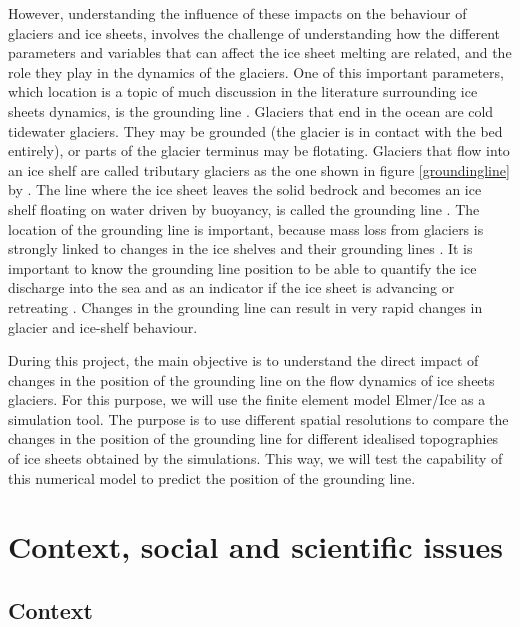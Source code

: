 \documentclass[a4paper,12pt]{article}
\begin{document}
However, understanding the influence of these impacts on the behaviour of glaciers and ice sheets, involves the challenge of understanding how the different parameters and variables that can affect the ice sheet melting are related, and the role they play in the dynamics of the glaciers. One of this important parameters, which location is a topic of much discussion in the literature surrounding ice sheets dynamics, is the grounding line \cite[]{goldberg2018representing}. Glaciers that end in the ocean are cold tidewater glaciers. They may be grounded (the glacier is in contact with the bed entirely), or parts of the glacier terminus may be flotating. Glaciers that flow into an ice shelf are called tributary glaciers as the one shown in figure \ref{groundingline} by \cite{parizek2010implications}. The line where the ice sheet leaves the solid bedrock and becomes an ice shelf floating on water driven by buoyancy, is called the grounding line \cite[]{cheng2019full}. The location of the grounding line is important, because mass loss from glaciers is strongly linked to changes in the ice shelves and their grounding lines \cite[]{brunt2010mapping,pritchard2012antarctic}. It is important to know the grounding line position to be able to quantify the ice discharge into the sea and as an indicator if the ice sheet is advancing or retreating \cite[]{konrad2018net}. Changes in the grounding line can result in very rapid changes in glacier and ice-shelf behaviour.

During this project, the main objective is to understand the direct impact of changes in the position of the grounding line on the flow dynamics of ice sheets glaciers. For this purpose, we will use the finite element model Elmer/Ice as a simulation tool. The purpose is to use different spatial resolutions to compare the changes in the position of the grounding line for different idealised topographies of ice sheets obtained by the simulations. This way, we will test the capability of this numerical model to predict the position of the grounding line.
\section{Context, social and scientific issues}
\subsection{Context}
\end{document}
